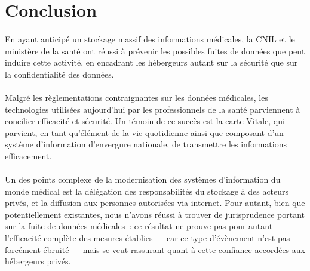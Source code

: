     \section*{Conclusion}

\paragraph{}
En ayant anticipé un stockage massif des informations médicales, la CNIL et le
ministère de la santé ont réussi à prévenir les possibles fuites de données que
peut induire cette activité, en encadrant les hébergeurs autant sur la sécurité
que sur la confidentialité des données.

\paragraph{}
Malgré les règlementations contraignantes sur les données médicales, les
technologies utilisées aujourd'hui par les professionnels de la santé
parviennent à concilier efficacité et sécurité. Un témoin de ce succès est la
carte Vitale, qui parvient, en tant qu'élément de la vie quotidienne ainsi que
composant d'un système d'information d'envergure nationale, de transmettre les
informations efficacement.

\paragraph{}
Un des points complexe de la modernisation des systèmes d'information du monde
médical est la délégation des responsabilités du stockage à des acteurs privés,
et la diffusion aux personnes autorisées via internet. Pour autant, bien que
potentiellement existantes, nous n'avons réussi à trouver de jurisprudence
portant sur la fuite de données médicales~: ce résultat ne prouve pas pour
autant l'efficacité complète des mesures établies --- car ce type d'évènement
n'est pas forcément ébruité --- mais se veut rassurant quant à cette confiance
accordées aux hébergeurs privés.
